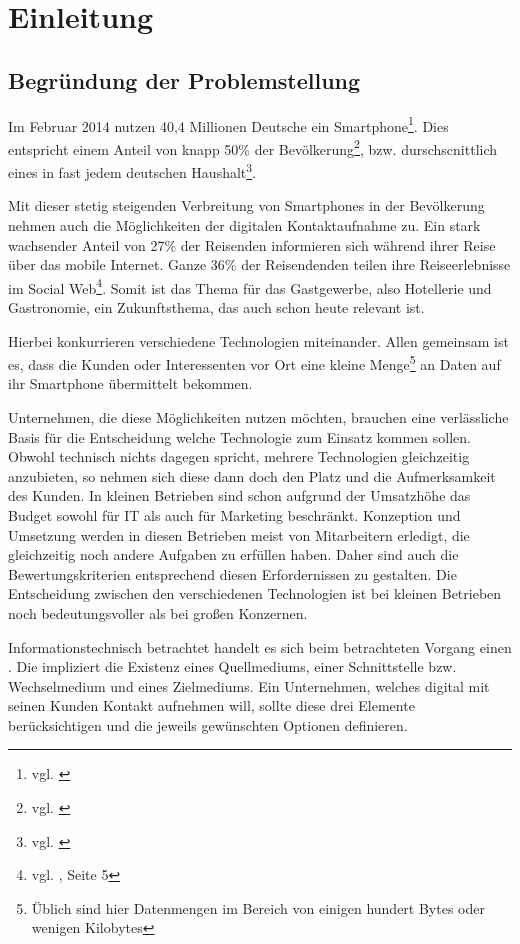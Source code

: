 \section{Einleitung}
\label{sec:einleitung}

\subsection{Begründung der Problemstellung} %

Im Februar 2014 nutzen 40,4 Millionen Deutsche ein Smartphone\footnote{vgl. \cite{netzoekonom}}. Dies entspricht einem Anteil von knapp 50\% der Bevölkerung\footnote{vgl. \cite{destatis:bev}}, bzw. durschscnittlich eines in fast jedem deutschen Haushalt\footnote{vgl. \cite{destatis:hh}}. 

Mit dieser stetig steigenden Verbreitung von Smartphones in der Bevölkerung nehmen auch die Möglichkeiten der digitalen Kontaktaufnahme zu. 
Ein stark wachsender Anteil von 27\% der Reisenden informieren sich während ihrer Reise über das mobile Internet. Ganze 36\% der Reisendenden  teilen ihre Reiseerlebnisse im Social Web\footnote{vgl. \cite{reiseanalyse}, Seite 5}. Somit ist das Thema für das Gastgewerbe, also Hotellerie und Gastronomie, ein Zukunftsthema, das auch schon heute relevant ist.

Hierbei konkurrieren verschiedene Technologien miteinander. Allen gemeinsam ist es, dass die Kunden oder Interessenten vor Ort eine kleine Menge\footnote{Üblich sind hier Datenmengen im Bereich von einigen hundert Bytes oder wenigen Kilobytes} an Daten auf ihr Smartphone übermittelt bekommen.

Unternehmen, die diese Möglichkeiten nutzen möchten, brauchen eine verlässliche Basis für die Entscheidung welche Technologie zum Einsatz kommen sollen. Obwohl technisch nichts dagegen spricht, mehrere Technologien gleichzeitig anzubieten, so nehmen sich diese dann doch den Platz und die Aufmerksamkeit des Kunden. In kleinen Betrieben sind schon aufgrund der Umsatzhöhe das Budget sowohl für \ac{IT} als auch für Marketing beschränkt. Konzeption und Umsetzung werden in diesen Betrieben meist von Mitarbeitern erledigt, die gleichzeitig noch andere Aufgaben zu erfüllen haben. Daher sind auch die Bewertungskriterien entsprechend diesen Erfordernissen zu gestalten. Die Entscheidung zwischen den verschiedenen Technologien ist bei kleinen Betrieben noch bedeutungsvoller als bei großen Konzernen.

Informationstechnisch betrachtet handelt es sich beim betrachteten Vorgang einen . Die impliziert die Existenz eines Quellmediums, einer Schnittstelle bzw. Wechselmedium und eines Zielmediums. Ein Unternehmen, welches digital mit seinen Kunden Kontakt aufnehmen will, sollte diese drei Elemente berücksichtigen und die jeweils gewünschten Optionen definieren.

